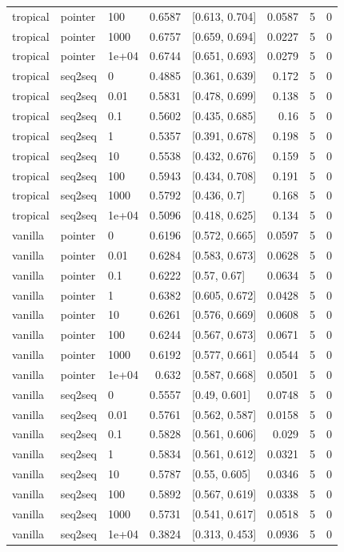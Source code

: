 \documentclass[10pt]{article}
\begin{document}
{\begin{longtable}{lllrlrrr}
tropical & pointer & 100 & 0.6587 & [0.613, 0.704] & 0.0587 & 5 & 0\\
tropical & pointer & 1000 & 0.6757 & [0.659, 0.694] & 0.0227 & 5 & 0\\
tropical & pointer & 1e+04 & 0.6744 & [0.651, 0.693] & 0.0279 & 5 & 0\\
tropical & seq2seq & 0 & 0.4885 & [0.361, 0.639] & 0.172 & 5 & 0\\
tropical & seq2seq & 0.01 & 0.5831 & [0.478, 0.699] & 0.138 & 5 & 0\\
tropical & seq2seq & 0.1 & 0.5602 & [0.435, 0.685] & 0.16 & 5 & 0\\
tropical & seq2seq & 1 & 0.5357 & [0.391, 0.678] & 0.198 & 5 & 0\\
tropical & seq2seq & 10 & 0.5538 & [0.432, 0.676] & 0.159 & 5 & 0\\
tropical & seq2seq & 100 & 0.5943 & [0.434, 0.708] & 0.191 & 5 & 0\\
tropical & seq2seq & 1000 & 0.5792 & [0.436, 0.7] & 0.168 & 5 & 0\\
tropical & seq2seq & 1e+04 & 0.5096 & [0.418, 0.625] & 0.134 & 5 & 0\\
vanilla & pointer & 0 & 0.6196 & [0.572, 0.665] & 0.0597 & 5 & 0\\
vanilla & pointer & 0.01 & 0.6284 & [0.583, 0.673] & 0.0628 & 5 & 0\\
vanilla & pointer & 0.1 & 0.6222 & [0.57, 0.67] & 0.0634 & 5 & 0\\
vanilla & pointer & 1 & 0.6382 & [0.605, 0.672] & 0.0428 & 5 & 0\\
vanilla & pointer & 10 & 0.6261 & [0.576, 0.669] & 0.0608 & 5 & 0\\
vanilla & pointer & 100 & 0.6244 & [0.567, 0.673] & 0.0671 & 5 & 0\\
vanilla & pointer & 1000 & 0.6192 & [0.577, 0.661] & 0.0544 & 5 & 0\\
vanilla & pointer & 1e+04 & 0.632 & [0.587, 0.668] & 0.0501 & 5 & 0\\
vanilla & seq2seq & 0 & 0.5557 & [0.49, 0.601] & 0.0748 & 5 & 0\\
vanilla & seq2seq & 0.01 & 0.5761 & [0.562, 0.587] & 0.0158 & 5 & 0\\
vanilla & seq2seq & 0.1 & 0.5828 & [0.561, 0.606] & 0.029 & 5 & 0\\
vanilla & seq2seq & 1 & 0.5834 & [0.561, 0.612] & 0.0321 & 5 & 0\\
vanilla & seq2seq & 10 & 0.5787 & [0.55, 0.605] & 0.0346 & 5 & 0\\
vanilla & seq2seq & 100 & 0.5892 & [0.567, 0.619] & 0.0338 & 5 & 0\\
vanilla & seq2seq & 1000 & 0.5731 & [0.541, 0.617] & 0.0518 & 5 & 0\\
vanilla & seq2seq & 1e+04 & 0.3824 & [0.313, 0.453] & 0.0936 & 5 & 0\\
\bottomrule
\end{longtable}
}
\end{document}
